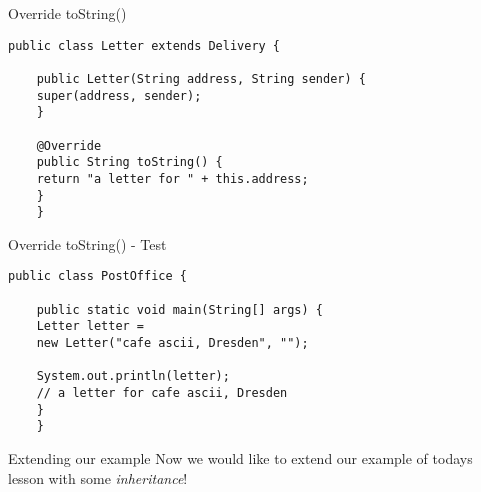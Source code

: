 \begin{frame}[fragile]{Override toString()}
	\begin{lstlisting}[escapechar=!]
	public class Letter extends Delivery {
	
	public Letter(String address, String sender) {
	super(address, sender);
	}
	
	@Override
	public String toString() {
	return "a letter for " + this.address;
	}	
	}
	\end{lstlisting}
\end{frame}

\begin{frame}[fragile]{Override toString() - Test}
	\begin{lstlisting}[escapechar=!]
	public class PostOffice {
	
	public static void main(String[] args) {	    
	Letter letter = 
	new Letter("cafe ascii, Dresden", "");
	
	System.out.println(letter);
	// a letter for cafe ascii, Dresden
	}
	}
	\end{lstlisting}
\end{frame}

\begin{frame}{Extending our example}
	Now we would like to extend our example of todays lesson with some \emph{inheritance}!
	
\end{frame}


